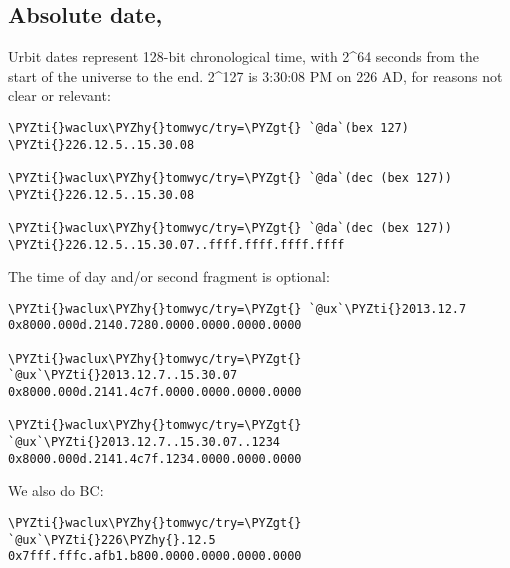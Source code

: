 \subsection{Absolute date, }

Urbit dates represent 128-bit chronological time, with 2\^{}64
seconds from the start of the universe to the end.  2\^{}127 is
3:30:08 PM on 226 AD, for reasons not clear or relevant:

\begin{framed_shaded}
\begin{Verbatim}[fontsize=\relsize{-2.5},fontseries=b,commandchars=\\\{\}]
\PYZti{}waclux\PYZhy{}tomwyc/try=\PYZgt{} `@da`(bex 127)
\PYZti{}226.12.5..15.30.08

\PYZti{}waclux\PYZhy{}tomwyc/try=\PYZgt{} `@da`(dec (bex 127))
\PYZti{}226.12.5..15.30.08

\PYZti{}waclux\PYZhy{}tomwyc/try=\PYZgt{} `@da`(dec (bex 127))
\PYZti{}226.12.5..15.30.07..ffff.ffff.ffff.ffff
\end{Verbatim}
\end{framed_shaded}

The time of day and/or second fragment is optional:

\begin{framed_shaded}
\begin{Verbatim}[fontsize=\relsize{-2.5},fontseries=b,commandchars=\\\{\}]
\PYZti{}waclux\PYZhy{}tomwyc/try=\PYZgt{} `@ux`\PYZti{}2013.12.7
0x8000.000d.2140.7280.0000.0000.0000.0000

\PYZti{}waclux\PYZhy{}tomwyc/try=\PYZgt{} `@ux`\PYZti{}2013.12.7..15.30.07
0x8000.000d.2141.4c7f.0000.0000.0000.0000

\PYZti{}waclux\PYZhy{}tomwyc/try=\PYZgt{} `@ux`\PYZti{}2013.12.7..15.30.07..1234
0x8000.000d.2141.4c7f.1234.0000.0000.0000
\end{Verbatim}
\end{framed_shaded}

We also do BC:

\begin{framed_shaded}
\begin{Verbatim}[fontsize=\relsize{-2.5},fontseries=b,commandchars=\\\{\}]
\PYZti{}waclux\PYZhy{}tomwyc/try=\PYZgt{} `@ux`\PYZti{}226\PYZhy{}.12.5
0x7fff.fffc.afb1.b800.0000.0000.0000.0000
\end{Verbatim}
\end{framed_shaded}


